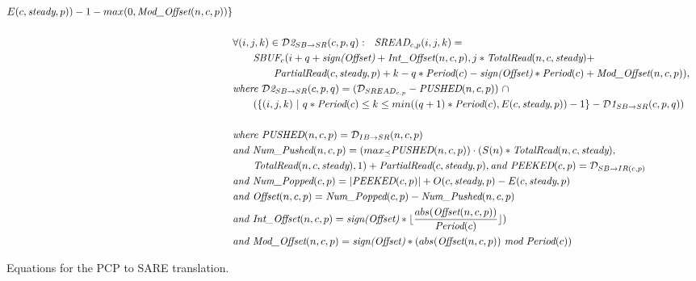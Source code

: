\begin{figure}[ht]
{\begin{minipage}{6.3in}
\begin{itemize}
\begin{align}
         E(c, \mt{steady}, p)) - 1 
         - max(0, \mt{Mod\_Offset}(n,c,p)) \}\\ \nonumber\\
\label{sbuf2sread1}
%
%
&\forall (i,j,k) \in {{\cal D}\mt{2}}_{SB \rightarrow SR}(c,p,q):~~
\mt{SREAD}_{c, p}(i,j,k) = \nonumber\\
    &~~~~~~\mt{SBUF}_{c}(i+q+
                  \mt{sign(Offset)} + \mt{Int\_Offset}(n,c,p),
                  j*\mt{TotalRead}(n,c,\mt{steady}) + \\\nonumber
                    &~~~~~~~~~~~~\mt{PartialRead}(c,\mt{steady},p)
		+ k
                   - q * \mt{Period}(c) 
                   - \mt{sign(Offset)} * \mt{Period}(c)
 + \mt{Mod\_Offset}(n,c,p)),\\ \nonumber&
\mt{where }{{\cal D}\mt{2}}_{SB \rightarrow SR}(c,p,q) = 
  ({\cal D}_{{SREAD}_{c, p}} - \mt{PUSHED}(n,c,p)) ~\cap~ \\ \nonumber
                         &~~~~~~( \{ (i,j,k)~|~q * \mt{Period}(c)
                                \le k 
                                \le min((q+1)*\mt{Period}(c),
                                              E(c, \mt{steady}, p)) - 1 \} - {{\cal D}\mt{1}}_{SB \rightarrow SR}(c,p,q) )\\ \nonumber\\
\label{sbuf2sread2}
%
%
&\mt{where }\mt{PUSHED}(n,c,p) = {\cal D}_{IB \rightarrow SR}(n,c,p) \nonumber\\ \nonumber
&\mt{and }\mt{Num\_Pushed}(n,c,p) = 
  (max_{\preceq}\mt{PUSHED}(n,c,p)) \cdot (S(n) * \mt{TotalRead}(n,c,\mt{steady}), \\ \nonumber
                                        &~~~~~~\mt{TotalRead}(n,c,\mt{steady}),
                                        1 ) + \mt{PartialRead}(c, \mt{steady}, p),
\mt{and }\mt{PEEKED}(c,p) = {\cal D}_{{SB \rightarrow IR}(c,p)} \\ \nonumber
&\mt{and }\mt{Num\_Popped}(c,p) = |\mt{PEEKED}(c,p)| + O(c,\mt{steady},p) - E(c,\mt{steady},p) \\
&\mt{and }\mt{Offset}(n,c,p) = \mt{Num\_Popped}(c,p)-\mt{Num\_Pushed}(n,c,p) \\ \nonumber
&\mt{and }\mt{Int\_Offset}(n,c,p) = \mt{sign(Offset)}*\lfloor \frac{abs(\mt{Offset}(n,c,p))}{\mt{Period}(c)} \rfloor) \\ \nonumber
&\mt{and }\mt{Mod\_Offset}(n,c,p) = \mt{sign(Offset)}*(abs(\mt{Offset}(n,c,p))~\mt{mod}~\mt{Period}(c))
%
\end{align}
%
\end{itemize}
\end{minipage}}
\caption{Equations for the PCP to SARE translation.
\protect\label{fig:pcptosare3}}
\end{figure}